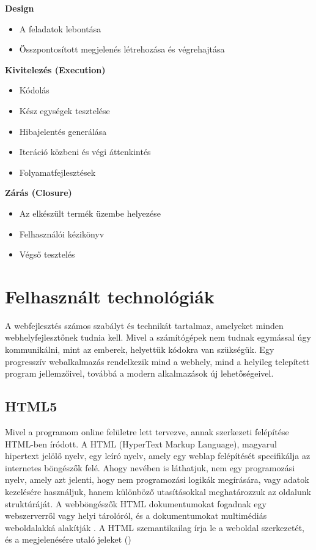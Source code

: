 \textbf{Design}
\begin{itemize}
\item A feladatok lebontása
\item Összpontosított megjelenés létrehozása és végrehajtása
\end{itemize}

\textbf{Kivitelezés (Execution)}
\begin{itemize}
\item Kódolás
\item Kész egységek tesztelése
\item Hibajelentés generálása
\item Iteráció közbeni és végi áttenkintés
\item Folyamatfejlesztések
\end{itemize}

\textbf{Zárás (Closure)}
\begin{itemize}
\item Az elkészült termék üzembe helyezése
\item Felhasználói kézikönyv
\item Végső tesztelés
\end{itemize}


\section{Felhasznált technológiák}

A webfejlesztés számos szabályt és technikát tartalmaz, amelyeket minden webhelyfejlesztőnek tudnia kell. Mivel a számítógépek nem tudnak egymással úgy kommunikálni, mint az emberek, helyettük kódokra van szükségük. Egy progresszív webalkalmazás rendelkezik mind a webhely, mind a helyileg telepített program jellemzőivel, továbbá a modern alkalmazások új lehetőségeivel.

\subsection{HTML5}
Mivel a programom online felületre lett tervezve, annak szerkezeti felépítése HTML-ben íródott. A HTML (HyperText Markup Language), magyarul hipertext jelölő nyelv, egy leíró nyelv, amely egy weblap felépítését specifikálja az internetes böngészők felé. Ahogy nevében is láthatjuk, nem egy programozási nyelv, amely azt jelenti, hogy nem programozási logikák megírására, vagy adatok kezelésére használjuk, hanem különböző utasításokkal meghatározzuk az oldalunk struktúráját. A webböngészők HTML dokumentumokat fogadnak egy webszerverről vagy helyi tárolóról, és a dokumentumokat multimédiás weboldalakká alakítják . A HTML szemantikailag írja le a weboldal szerkezetét, és  a megjelenésére utaló jeleket () \\

